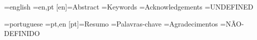 \babellanguagename[en]={english}
\abstractorder[en]={en,pt}
\abstractname[en]={Abstract}
\keywords[en]={Keywords}
\acknowledgements[en]={Acknowledgements}
\notdefined[en]={UNDEFINED} %


\babellanguagename[pt]={portuguese}
\abstractorder[pt]={pt,en}
\abstractname[pt]={Resumo}
\keywords[pt]={Palavras-chave}
\acknowledgements[en]={Agradecimentos}
\notdefined[pt]={NÃO-DEFINIDO} %
